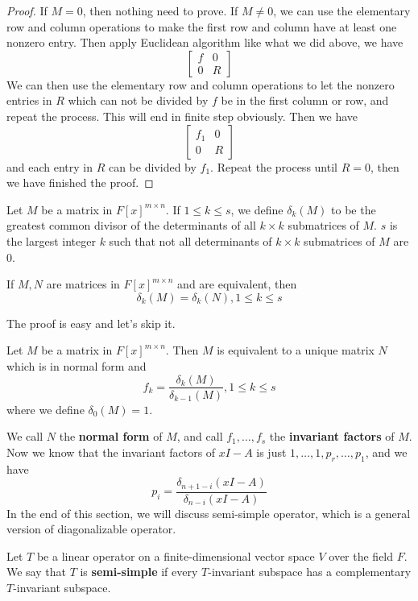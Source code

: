 \documentclass{article}
\begin{document}
\begin{proof}
	If $M=0$, then nothing need to prove. If $M\neq0$, we can use the elementary row and column operations to make the first row and column have at least one nonzero entry. Then apply Euclidean algorithm like what we did above, we have
	\[\begin{bmatrix}
		f&0\\
		0&R
	\end{bmatrix}\]
	We can then use the elementary row and column operations to let the nonzero entries in $R$ which can not be divided by $f$ be in the first column or row, and repeat the process. This will end in finite step obviously. Then we have
	\[\begin{bmatrix}
		f_1&0\\
		0&R
	\end{bmatrix}\]
	and each entry in $R$ can be divided by $f_1$. Repeat the process until $R=0$, then we have finished the proof.
\end{proof}
\begin{dde}
	Let $M$ be a matrix in $F[x]^{m\times n}$. If $1\le k\le s$, we define $\delta_k(M)$ to be the greatest common divisor of the determinants of all $k\times k$ submatrices of $M$. $s$ is the largest integer $k$ such that not all determinants of $k\times k$ submatrices of $M$ are $0$.
\end{dde}
\begin{thm}
	If $M,N$ are matrices in $F[x]^{m\times n}$ and are equivalent, then
	\[\delta_k(M)=\delta_k(N),1\le k\le s\]
\end{thm}
The proof is easy and let's skip it.
\begin{coro}
	Let $M$ be a matrix in $F[x]^{m\times n}$. Then $M$ is equivalent to a unique matrix $N$ which is in normal form and 
	\[f_k=\frac{\delta_k(M)}{\delta_{k-1}(M)},1\le k\le s\]
	where we define $\delta_0(M)=1$.
\end{coro}
We call $N$ the \textbf{normal form} of $M$, and call $f_1,\dots,f_s$ the \textbf{invariant factors} of $M$.\\
\indent Now we know that the invariant factors of $xI-A$ is just $1,\dots,1,p_r,\dots,p_1$, and we have
\[p_i=\frac{\delta_{n+1-i}(xI-A)}{\delta_{n-i}(xI-A)}\]
In the end of this section, we will discuss semi-simple operator, which is a general version of diagonalizable operator.
\begin{dde}
	Let $T$ be a linear operator on a finite-dimensional vector space $V$ over the field $F$. We say that $T$ is \textbf{semi-simple} if every $T$-invariant subspace has a complementary $T$-invariant subspace. 
\end{dde}
\end{document}
